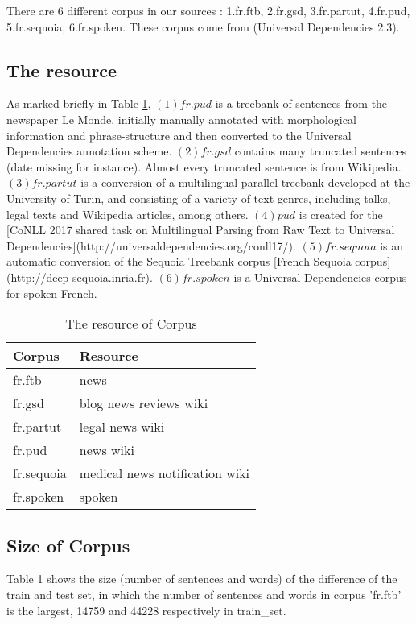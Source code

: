 \documentclass{article}
\begin{document}
There are 6 different corpus in our sources : 1.fr.ftb, 2.fr.gsd, 3.fr.partut, 4.fr.pud, 5.fr.sequoia, 6.fr.spoken. These corpus come from (Universal Dependencies 2.3). 

\subsection{The resource}
As marked briefly in Table \ref{table_resource}, $(1) fr.pud$  is a treebank of sentences from the newspaper Le Monde, initially manually annotated with morphological information and phrase-structure and then converted to the Universal Dependencies annotation scheme. $(2) fr.gsd$ contains many truncated sentences (date missing for instance). Almost every truncated sentence is from Wikipedia. $(3) fr.partut$ is a conversion of a multilingual parallel treebank developed at the University of Turin, and consisting of a variety of text genres, including talks, legal texts and Wikipedia articles, among others. $(4) pud$ is created for the [CoNLL 2017 shared task on Multilingual Parsing from Raw Text to Universal Dependencies](http://universaldependencies.org/conll17/). $(5) fr.sequoia$ is an automatic conversion of the Sequoia Treebank corpus [French Sequoia corpus](http://deep-sequoia.inria.fr). $(6) fr.spoken$ is a Universal Dependencies corpus for spoken French.

\begin{table}[h]
\caption{The resource of Corpus}
\vspace{5pt}
\centering
    
\begin{tabular}{|l|l|}
\hline
Corpus & Resource\\
\hline
fr.ftb     & news \\
fr.gsd     & blog news reviews wiki\\
fr.partut  & legal news wiki\\
fr.pud     & news wiki\\
fr.sequoia & medical news notification wiki\\
fr.spoken  & spoken \\
\hline
\end{tabular}
\label{table_resource}
\end{table}


\subsection{Size of Corpus} 
Table 1 shows the size (number of sentences and words) of the difference of the train and test set, in which the number of sentences and words in corpus 'fr.ftb' is the largest, 14759 and 44228 respectively in train\_set. 
\end{document}
